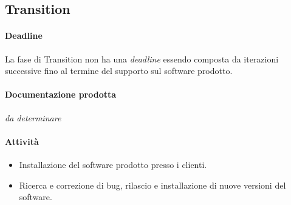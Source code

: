 \subsection{Transition}

\paragraph{Deadline}
La fase di Transition non ha una \emph{deadline} essendo composta da iterazioni successive fino al termine del supporto sul software prodotto.

\paragraph{Documentazione prodotta}
\emph{da determinare}

\paragraph{Attivit\`a}
\begin{itemize}
	\item Installazione del software prodotto presso i clienti.
	\item Ricerca e correzione di bug, rilascio e installazione di nuove versioni del software.
\end{itemize}

